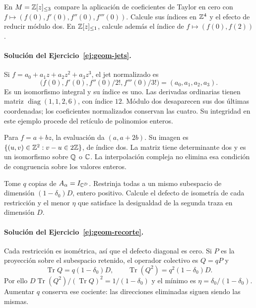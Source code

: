 \begin{ejercicio}\label{ej:geom-jets}
En $M=\mathbb{Z}[z]_{\le3}$ compare la aplicación de coeficientes
de Taylor en cero con
$f\mapsto(f(0),f'(0),f''(0),f'''(0))$.
Calcule sus índices en $\mathbb{Z}^4$ y el efecto de reducir módulo
dos. En $\mathbb{Z}[z]_{\le1}$, calcule además el índice de
$f\mapsto(f(0),f(2))$.
\end{ejercicio}

\paragraph{Solución del Ejercicio~\ref{ej:geom-jets}.}
Si $f=a_0+a_1z+a_2z^2+a_3z^3$, el jet normalizado es
\[
 \bigl(f(0),f'(0),f''(0)/2!,f'''(0)/3!\bigr)
                         =(a_0,a_1,a_2,a_3).
\]
Es un isomorfismo integral y su índice es uno.
Las derivadas ordinarias tienen matriz
$\operatorname{diag}(1,1,2,6)$, con índice $12$.
Módulo dos desaparecen sus dos últimas coordenadas;
los coeficientes normalizados conservan las cuatro.
Su integridad en este ejemplo procede del retículo de
polinomios enteros.

Para $f=a+bz$, la evaluación da $(a,a+2b)$.
Su imagen es
$\{(u,v)\in\mathbb{Z}^2:v-u\in2\mathbb{Z}\}$, de índice dos.
La matriz tiene determinante dos y es un isomorfismo
sobre $\mathbb{Q}$ o $\mathbb{C}$.
La interpolación compleja no elimina esa condición de
congruencia sobre los valores enteros.

\begin{ejercicio}\label{ej:geom-recorte}
Tome $q$ copias de $A_\alpha=I_{\mathbb{C}^D}$.
Restrinja todas a un mismo subespacio de dimensión
$(1-\delta_0)D$, entero positivo.
Calcule el defecto de isometría de cada restricción y
el menor $\eta$ que satisface la desigualdad de la
segunda traza en dimensión $D$.
\end{ejercicio}

\paragraph{Solución del Ejercicio~\ref{ej:geom-recorte}.}
Cada restricción es isométrica, así que el defecto diagonal
es cero. Si $P$ es la proyección sobre el subespacio retenido,
el operador colectivo es $Q=qP$ y
\[
 \operatorname{Tr}Q=q(1-\delta_0)D,\qquad
 \operatorname{Tr}(Q^2)=q^2(1-\delta_0)D.
\]
Por ello
$D\operatorname{Tr}(Q^2)/(\operatorname{Tr}Q)^2
=1/(1-\delta_0)$ y el mínimo es
$\eta=\delta_0/(1-\delta_0)$.
Aumentar $q$ conserva ese cociente: las direcciones
eliminadas siguen siendo las mismas.

